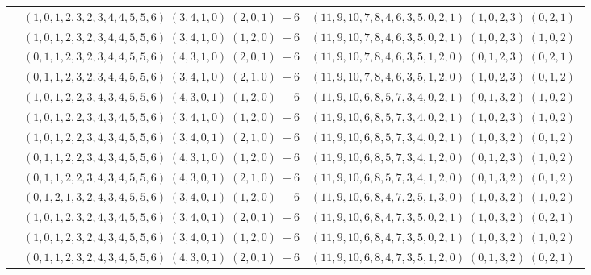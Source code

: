 \documentclass[11pt]{article}
\begin{document}
\begin{longtable}[l]{|c|c|c|}
 \cline{2-3} 
 & $(1 ,0 ,1 ,2 ,3 ,2 ,3 ,4 ,4 ,5 ,5 ,6) \;(3 ,4 ,1 ,0) \;(2 ,0 ,1) \;-6$ & $(11 ,9 ,10 ,7 ,8 ,4 ,6 ,3 ,5 ,0 ,2 ,1) \;(1 ,0 ,2 ,3) \;(0 ,2 ,1) \;$\\ 
 \cline{2-3} 
 & $(1 ,0 ,1 ,2 ,3 ,2 ,3 ,4 ,4 ,5 ,5 ,6) \;(3 ,4 ,1 ,0) \;(1 ,2 ,0) \;-6$ & $(11 ,9 ,10 ,7 ,8 ,4 ,6 ,3 ,5 ,0 ,2 ,1) \;(1 ,0 ,2 ,3) \;(1 ,0 ,2) \;$\\ 
 \cline{2-3} 
 & $(0 ,1 ,1 ,2 ,3 ,2 ,3 ,4 ,4 ,5 ,5 ,6) \;(4 ,3 ,1 ,0) \;(2 ,0 ,1) \;-6$ & $(11 ,9 ,10 ,7 ,8 ,4 ,6 ,3 ,5 ,1 ,2 ,0) \;(0 ,1 ,2 ,3) \;(0 ,2 ,1) \;$\\ 
 \cline{2-3} 
 & $(0 ,1 ,1 ,2 ,3 ,2 ,3 ,4 ,4 ,5 ,5 ,6) \;(3 ,4 ,1 ,0) \;(2 ,1 ,0) \;-6$ & $(11 ,9 ,10 ,7 ,8 ,4 ,6 ,3 ,5 ,1 ,2 ,0) \;(1 ,0 ,2 ,3) \;(0 ,1 ,2) \;$\\ 
 \cline{2-3} 
 & $(1 ,0 ,1 ,2 ,2 ,3 ,4 ,3 ,4 ,5 ,5 ,6) \;(4 ,3 ,0 ,1) \;(1 ,2 ,0) \;-6$ & $(11 ,9 ,10 ,6 ,8 ,5 ,7 ,3 ,4 ,0 ,2 ,1) \;(0 ,1 ,3 ,2) \;(1 ,0 ,2) \;$\\ 
 \cline{2-3} 
 & $(1 ,0 ,1 ,2 ,2 ,3 ,4 ,3 ,4 ,5 ,5 ,6) \;(3 ,4 ,1 ,0) \;(1 ,2 ,0) \;-6$ & $(11 ,9 ,10 ,6 ,8 ,5 ,7 ,3 ,4 ,0 ,2 ,1) \;(1 ,0 ,2 ,3) \;(1 ,0 ,2) \;$\\ 
 \cline{2-3} 
 & $(1 ,0 ,1 ,2 ,2 ,3 ,4 ,3 ,4 ,5 ,5 ,6) \;(3 ,4 ,0 ,1) \;(2 ,1 ,0) \;-6$ & $(11 ,9 ,10 ,6 ,8 ,5 ,7 ,3 ,4 ,0 ,2 ,1) \;(1 ,0 ,3 ,2) \;(0 ,1 ,2) \;$\\ 
 \cline{2-3} 
 & $(0 ,1 ,1 ,2 ,2 ,3 ,4 ,3 ,4 ,5 ,5 ,6) \;(4 ,3 ,1 ,0) \;(1 ,2 ,0) \;-6$ & $(11 ,9 ,10 ,6 ,8 ,5 ,7 ,3 ,4 ,1 ,2 ,0) \;(0 ,1 ,2 ,3) \;(1 ,0 ,2) \;$\\ 
 \cline{2-3} 
 & $(0 ,1 ,1 ,2 ,2 ,3 ,4 ,3 ,4 ,5 ,5 ,6) \;(4 ,3 ,0 ,1) \;(2 ,1 ,0) \;-6$ & $(11 ,9 ,10 ,6 ,8 ,5 ,7 ,3 ,4 ,1 ,2 ,0) \;(0 ,1 ,3 ,2) \;(0 ,1 ,2) \;$\\ 
 \cline{2-3} 
 & $(0 ,1 ,2 ,1 ,3 ,2 ,4 ,3 ,4 ,5 ,5 ,6) \;(3 ,4 ,0 ,1) \;(1 ,2 ,0) \;-6$ & $(11 ,9 ,10 ,6 ,8 ,4 ,7 ,2 ,5 ,1 ,3 ,0) \;(1 ,0 ,3 ,2) \;(1 ,0 ,2) \;$\\ 
 \cline{2-3} 
 & $(1 ,0 ,1 ,2 ,3 ,2 ,4 ,3 ,4 ,5 ,5 ,6) \;(3 ,4 ,0 ,1) \;(2 ,0 ,1) \;-6$ & $(11 ,9 ,10 ,6 ,8 ,4 ,7 ,3 ,5 ,0 ,2 ,1) \;(1 ,0 ,3 ,2) \;(0 ,2 ,1) \;$\\ 
 \cline{2-3} 
 & $(1 ,0 ,1 ,2 ,3 ,2 ,4 ,3 ,4 ,5 ,5 ,6) \;(3 ,4 ,0 ,1) \;(1 ,2 ,0) \;-6$ & $(11 ,9 ,10 ,6 ,8 ,4 ,7 ,3 ,5 ,0 ,2 ,1) \;(1 ,0 ,3 ,2) \;(1 ,0 ,2) \;$\\ 
 \cline{2-3} 
 & $(0 ,1 ,1 ,2 ,3 ,2 ,4 ,3 ,4 ,5 ,5 ,6) \;(4 ,3 ,0 ,1) \;(2 ,0 ,1) \;-6$ & $(11 ,9 ,10 ,6 ,8 ,4 ,7 ,3 ,5 ,1 ,2 ,0) \;(0 ,1 ,3 ,2) \;(0 ,2 ,1) \;$\\ 

\end{longtable}
\end{document}
